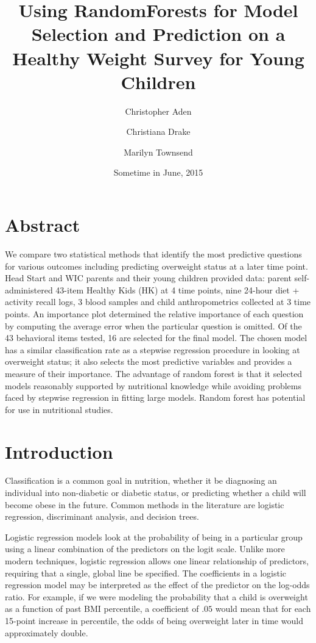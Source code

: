 \documentclass[11pt]{article}
\title{Using RandomForests for Model Selection and Prediction on a Healthy Weight Survey for Young Children}
\author{Christopher Aden \and Christiana Drake \and Marilyn Townsend}
\date{Sometime in June, 2015}
\begin{document}
\maketitle

\section*{Abstract}
We compare two statistical methods that identify the most predictive questions for various outcomes including predicting overweight status at a later time point. Head Start and WIC parents and their young children provided data: parent self-administered 43-item Healthy Kids (HK) at 4 time points, nine 24-hour diet + activity recall logs, 3 blood samples and child anthropometrics collected at 3 time points. An importance plot determined the relative importance of each question by computing the average error when the particular question is omitted. Of the 43 behavioral items tested, 16 are selected for the final model. The chosen model has a similar classification rate as a stepwise regression procedure in looking at overweight status; it also selects the most predictive variables and provides a measure of their importance. The advantage of random forest is that it selected models reasonably supported by nutritional knowledge while avoiding problems faced by stepwise regression in fitting large models. Random forest has potential for use in nutritional studies. 

\section*{Introduction}
Classification is a common goal in nutrition, whether it be diagnosing an individual into non-diabetic or diabetic status, or predicting whether a child will become obese in the future. Common methods in the literature are logistic regression, discriminant analysis, and decision trees.

Logistic regression models look at the probability of being in a particular group using a linear combination of the predictors on the logit scale. Unlike more modern techniques, logistic regression allows one linear relationship of predictors, requiring that a single, global line be specified. The coefficients in a logistic regression model may be interpreted as the effect of the predictor on the log-odds ratio. For example, if we were modeling the probability that a child is overweight as a function of past BMI percentile, a coefficient of $.05$ would mean that for each 15-point increase in percentile, the odds of being overweight later in time would approximately double.
\end{document}
